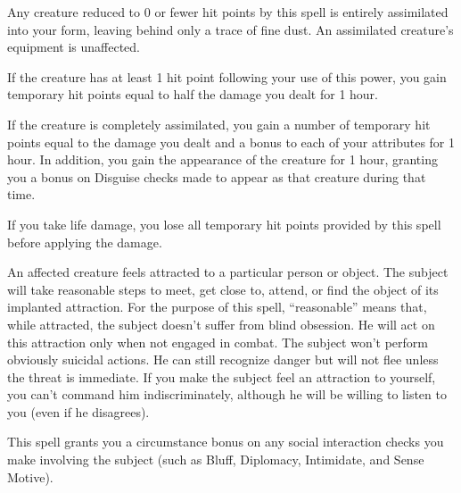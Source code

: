 \spellrng{\rngtouch}
\par Any creature reduced to 0 or fewer hit points by this spell is entirely assimilated into your form, leaving behind only a trace of fine dust. An assimilated creature's equipment is unaffected.
\par If the creature has at least 1 hit point following your use of this power, you gain temporary hit points equal to half the damage you dealt for 1 hour.
\par If the creature is completely assimilated, you gain a number of temporary hit points equal to the damage you dealt and a  bonus to each of your attributes for 1 hour. In addition, you gain the appearance of the creature for 1 hour, granting you a  bonus on Disguise checks made to appear as that creature during that time.

If you take life damage, you lose all temporary hit points provided by this spell before applying the damage.

\spellrng{\rngmed}
\spelldur{\durext}
\begin{spelleffect}
  An affected creature feels attracted to a particular person or object. The subject will take reasonable steps to meet, get close to, attend, or find the object of its implanted attraction. For the purpose of this spell, ``reasonable'' means that, while attracted, the subject doesn't suffer from blind obsession. He will act on this attraction only when not engaged in combat. The subject won't perform obviously suicidal actions. He can still recognize danger but will not flee unless the threat is immediate. If you make the subject feel an attraction to yourself, you can't command him indiscriminately, although he will be willing to listen to you (even if he disagrees).
  \par This spell grants you a  circumstance bonus on any social interaction checks you make involving the subject (such as Bluff, Diplomacy, Intimidate, and Sense Motive).
\end{spelleffect}

